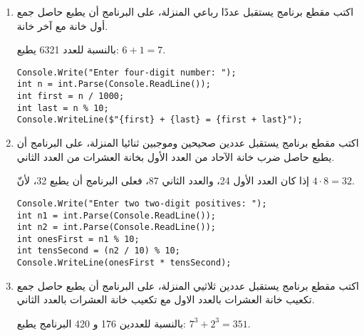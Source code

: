 ﻿\documentclass[12pt]{article}
\begin{document}
\begin{enumerate}[itemsep=2em]
\item
    اكتب مقطع برنامج يستقبل عددًا رباعي المنزلة، على البرنامج أن يطبع حاصل جمع أول خانة مع آخر خانة. \\
    \begin{boxExample}
        بالنسبة للعدد 6321 يطبع: $6 + 1 = 7$.
    \end{boxExample}

\ifwithsols
\begin{boxSolution}
\begin{english}
\begin{verbatim}
Console.Write("Enter four-digit number: ");
int n = int.Parse(Console.ReadLine());
int first = n / 1000;
int last = n % 10;
Console.WriteLine($"{first} + {last} = {first + last}");
\end{verbatim}
\end{english}
\end{boxSolution}
\fi

    \item
    اكتب مقطع برنامج يستقبل عددين صحيحين وموجبين ثنائيا المنزلة، على البرنامج أن يطبع حاصل ضرب خانة الآحاد من العدد الأول بخانة العشرات من العدد الثاني. \\
    \begin{boxExample}
        إذا كان العدد الأول 24، والعدد الثاني 87، فعلى البرنامج أن يطبع 32، لأنّ $4 \cdot 8 = 32$.
    \end{boxExample}

\ifwithsols
\begin{boxSolution}
\begin{english}
\begin{verbatim}
Console.Write("Enter two two-digit positives: ");
int n1 = int.Parse(Console.ReadLine());
int n2 = int.Parse(Console.ReadLine());
int onesFirst = n1 % 10;
int tensSecond = (n2 / 10) % 10;
Console.WriteLine(onesFirst * tensSecond);
\end{verbatim}
\end{english}
\end{boxSolution}
\clearpage
\fi

\item
    اكتب مقطع برنامج يستقبل عددين ثلاثيي المنزلة، على البرنامج أن يطبع حاصل جمع تكعيب خانة العشرات بالعدد الاول مع تكعيب خانة العشرات بالعدد الثاني. \\
    \begin{boxExample}
    بالنسبة للعددين 176 و 420 البرنامج يطبع: $7^3 + 2^3 = 351$.
    \end{boxExample}


\end{enumerate}
\end{document}
